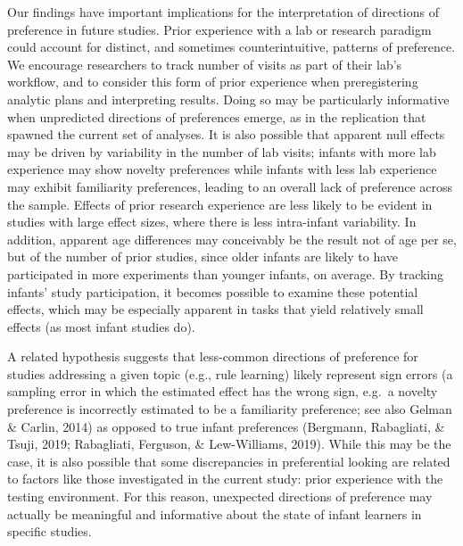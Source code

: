 \documentclass[english,man,man,floatsintext]{apa6}
\begin{document}
Our findings have important implications for the interpretation of directions of preference in future studies. Prior experience with a lab or research paradigm could account for distinct, and sometimes counterintuitive, patterns of preference. We encourage researchers to track number of visits as part of their lab's workflow, and to consider this form of prior experience when preregistering analytic plans and interpreting results. Doing so may be particularly informative when unpredicted directions of preferences emerge, as in the replication that spawned the current set of analyses. It is also possible that apparent null effects may be driven by variability in the number of lab visits; infants with more lab experience may show novelty preferences while infants with less lab experience may exhibit familiarity preferences, leading to an overall lack of preference across the sample. Effects of prior research experience are less likely to be evident in studies with large effect sizes, where there is less intra-infant variability. In addition, apparent age differences may conceivably be the result not of age per se, but of the number of prior studies, since older infants are likely to have participated in more experiments than younger infants, on average. By tracking infants' study participation, it becomes possible to examine these potential effects, which may be especially apparent in tasks that yield relatively small effects (as most infant studies do).

A related hypothesis suggests that less-common directions of preference for studies addressing a given topic (e.g., rule learning) likely represent sign errors (a sampling error in which the estimated effect has the wrong sign, e.g.~a novelty preference is incorrectly estimated to be a familiarity preference; see also Gelman \& Carlin, 2014) as opposed to true infant preferences (Bergmann, Rabagliati, \& Tsuji, 2019; Rabagliati, Ferguson, \& Lew-Williams, 2019). While this may be the case, it is also possible that some discrepancies in preferential looking are related to factors like those investigated in the current study: prior experience with the testing environment. For this reason, unexpected directions of preference may actually be meaningful and informative about the state of infant learners in specific studies.
\end{document}
